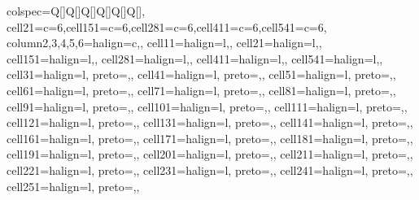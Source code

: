 \begin{table}
\centering
\begin{talltblr}[         %
entry=none,label=none,
note{}={* p \num{< 0.1}, ** p \num{< 0.05}, *** p \num{< 0.01}},
]                     %
{                     %
colspec={Q[]Q[]Q[]Q[]Q[]Q[]},
cell{2}{1}={c=6}{},cell{15}{1}={c=6}{},cell{28}{1}={c=6}{},cell{41}{1}={c=6}{},cell{54}{1}={c=6}{},
column{2,3,4,5,6}={}{halign=c,},
cell{1}{1}={}{halign=l,},
cell{2}{1}={}{halign=l,},
cell{15}{1}={}{halign=l,},
cell{28}{1}={}{halign=l,},
cell{41}{1}={}{halign=l,},
cell{54}{1}={}{halign=l,},
cell{3}{1}={}{halign=l, preto={\hspace{1em}},},
cell{4}{1}={}{halign=l, preto={\hspace{1em}},},
cell{5}{1}={}{halign=l, preto={\hspace{1em}},},
cell{6}{1}={}{halign=l, preto={\hspace{1em}},},
cell{7}{1}={}{halign=l, preto={\hspace{1em}},},
cell{8}{1}={}{halign=l, preto={\hspace{1em}},},
cell{9}{1}={}{halign=l, preto={\hspace{1em}},},
cell{10}{1}={}{halign=l, preto={\hspace{1em}},},
cell{11}{1}={}{halign=l, preto={\hspace{1em}},},
cell{12}{1}={}{halign=l, preto={\hspace{1em}},},
cell{13}{1}={}{halign=l, preto={\hspace{1em}},},
cell{14}{1}={}{halign=l, preto={\hspace{1em}},},
cell{16}{1}={}{halign=l, preto={\hspace{1em}},},
cell{17}{1}={}{halign=l, preto={\hspace{1em}},},
cell{18}{1}={}{halign=l, preto={\hspace{1em}},},
cell{19}{1}={}{halign=l, preto={\hspace{1em}},},
cell{20}{1}={}{halign=l, preto={\hspace{1em}},},
cell{21}{1}={}{halign=l, preto={\hspace{1em}},},
cell{22}{1}={}{halign=l, preto={\hspace{1em}},},
cell{23}{1}={}{halign=l, preto={\hspace{1em}},},
cell{24}{1}={}{halign=l, preto={\hspace{1em}},},
cell{25}{1}={}{halign=l, preto={\hspace{1em}},},
}
\end{talltblr}
\end{table}
